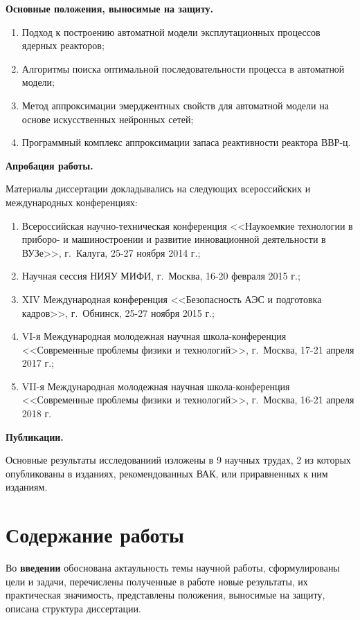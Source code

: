 \textbf{Основные положения, выносимые на защиту.}

\begin{enumerate}
    \item Подход к построению автоматной модели эксплутационных процессов ядерных реакторов;
    \item Алгоритмы поиска оптимальной последовательности процесса в автоматной модели;
    \item Метод аппроксимации эмерджентных свойств для автоматной модели на основе искусственных нейронных сетей;
    \item Программный комплекс аппроксимации запаса реактивности реактора ВВР-ц.
\end{enumerate}

\textbf{Апробация работы.}

Материалы диссертации докладывались на следующих всероссийских и международных конференциях:

\begin{enumerate}
    \item Всероссийская научно-техническая конференция <<Наукоемкие технологии в приборо- и машиностроении и развитие инновационной деятельности в ВУЗе>>, г.~Калуга, 25-27 ноября 2014 г.;
    \item Научная сессия НИЯУ МИФИ, г.~Москва, 16-20 февраля 2015 г.;
    \item XIV Международная конференция <<Безопасность АЭС и подготовка кадров>>, г.~Обнинск, 25-27 ноября 2015 г.;
    \item VI-я Международная молодежная научная школа-конференция <<Современные проблемы физики и технологий>>, г.~Москва, 17-21 апреля 2017 г.;
    \item VII-я Международная молодежная научная школа-конференция <<Современные проблемы физики и технологий>>, г.~Москва, 16-21 апреля 2018 г.
\end{enumerate}

\textbf{Публикации.}

Основные результаты исследованиий изложены в 9 научных трудах, 2 из которых опубликованы в изданиях, рекомендованных ВАК, или приравненных к ним изданиям.


\section*{Содержание работы}

Во \textbf{введении} обоснована актаульность темы научной работы, сформулированы цели и задачи, перечислены полученные в работе новые результаты, их практическая значимость, представлены положения, выносимые на защиту, описана структура диссертации.

